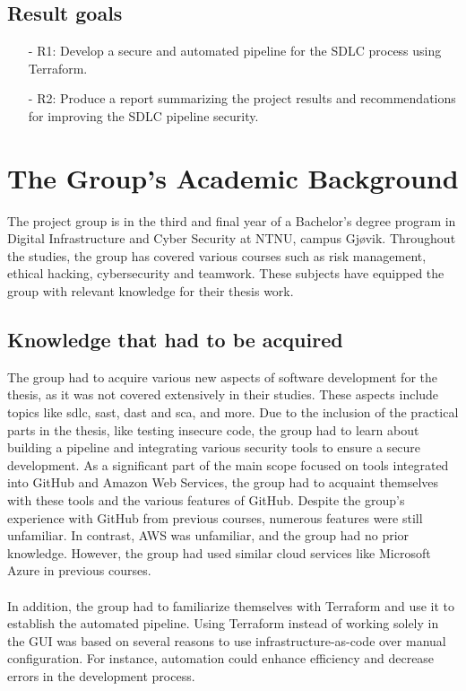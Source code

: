 \subsection{Result goals}
\begin{itemize}
    
    \item[-] R1: Develop a secure and automated pipeline for the SDLC process using Terraform. 
    
    \item[-] R2: Produce a report summarizing the project results and recommendations for improving the SDLC pipeline security.
    
\end{itemize}


\section{The Group's Academic Background}
The project group is in the third and final year of a Bachelor's degree program in Digital Infrastructure and Cyber Security at NTNU, campus Gjøvik. Throughout the studies, the group has covered various courses such as risk management, ethical hacking, cybersecurity and teamwork. These subjects have equipped the group with relevant knowledge for their thesis work.

\subsection{Knowledge that had to be acquired}
\label{section: Knowledge that had to be acquired}
The group had to acquire various new aspects of software development for the thesis, as it was not covered extensively in their studies. These aspects include topics like \acrshort{sdlc}, \acrlong{sast}, \acrlong{dast} and \acrlong{sca}, and more. Due to the inclusion of the practical parts in the thesis, like testing insecure code, the group had to learn about building a pipeline and integrating various security tools to ensure a secure development. As a significant part of the main scope focused on tools integrated into GitHub and Amazon Web Services, the group had to acquaint themselves with these tools and the various features of GitHub. Despite the group's experience with GitHub from previous courses, numerous features were still unfamiliar. In contrast, AWS was unfamiliar, and the group had no prior knowledge. However, the group had used similar cloud services like Microsoft Azure in previous courses.
\\~\\
In addition, the group had to familiarize themselves with Terraform and use it to establish the automated pipeline. Using Terraform instead of working solely in the GUI was based on several reasons to use infrastructure-as-code over manual configuration. For instance, automation could enhance efficiency and decrease errors in the development process.

